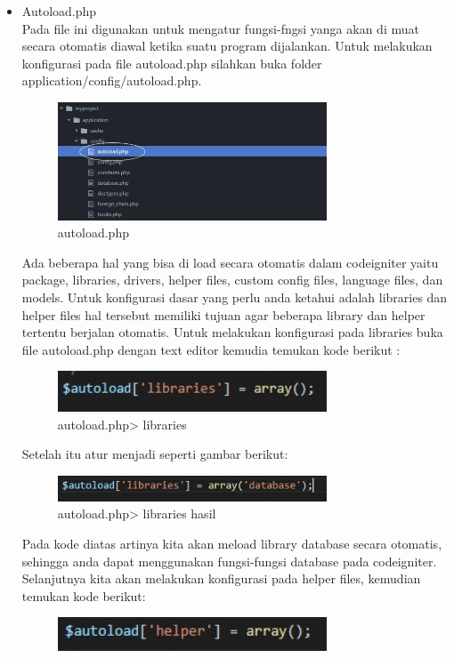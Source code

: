 	\begin{itemize}
	\item Autoload.php
	\hfill\\
	Pada file ini digunakan untuk mengatur fungsi-fngsi yanga akan di muat secara otomatis diawal ketika suatu program dijalankan. Untuk melakukan konfigurasi pada file autoload.php silahkan buka folder application/config/autoload.php.
		\begin{figure}[H]
			\includegraphics[width=8cm]{figures/instalasi/ci28.jpg}
			\centering
			\caption{autoload.php}
		\end{figure}
		Ada beberapa hal yang bisa di load secara otomatis dalam codeigniter yaitu package, libraries, drivers, helper files, custom config files, language files, dan models.
Untuk konfigurasi dasar yang perlu anda ketahui adalah libraries dan helper files hal tersebut memiliki tujuan agar beberapa library dan helper tertentu berjalan otomatis. 
Untuk melakukan konfigurasi pada libraries buka file autoload.php dengan text editor kemudia temukan kode berikut :
		\begin{figure}[H]
			\includegraphics[width=8cm]{figures/instalasi/ci29.jpg}
			\centering
			\caption{autoload.php> libraries}
		\end{figure}
		Setelah itu atur menjadi seperti gambar berikut:
		\begin{figure}[H]
			\includegraphics[width=8cm]{figures/instalasi/ci30.jpg}
			\centering
			\caption{autoload.php> libraries hasil}
		\end{figure}
		Pada kode diatas artinya kita akan meload library database secara otomatis, sehingga anda dapat menggunakan fungsi-fungsi database pada codeigniter. 
Selanjutnya kita akan melakukan konfigurasi pada helper files,  kemudian temukan kode berikut:
		\begin{figure}[H]
			\includegraphics[width=8cm]{figures/instalasi/ci31.jpg}

\end{figure}
\end{itemize}
